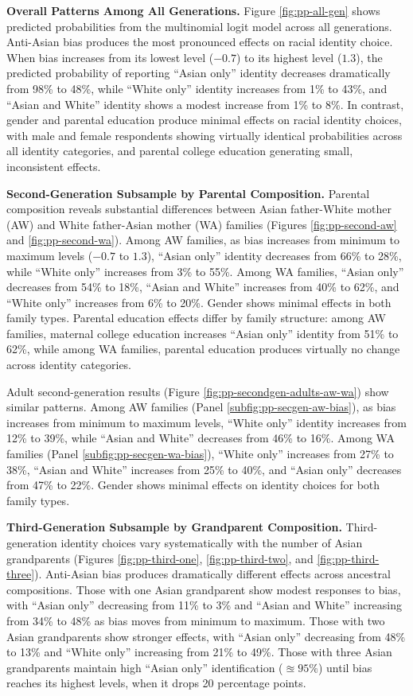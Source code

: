 \textbf{Overall Patterns Among All Generations.} Figure \ref{fig:pp-all-gen} shows predicted probabilities from the multinomial logit model across all generations. Anti-Asian bias produces the most pronounced effects on racial identity choice. When bias increases from its lowest level ($-0.7$) to its highest level ($1.3$), the predicted probability of reporting ``Asian only'' identity decreases dramatically from 98\% to 48\%, while ``White only'' identity increases from 1\% to 43\%, and ``Asian and White'' identity shows a modest increase from 1\% to 8\%. In contrast, gender and parental education produce minimal effects on racial identity choices, with male and female respondents showing virtually identical probabilities across all identity categories, and parental college education generating small, inconsistent effects.

\textbf{Second-Generation Subsample by Parental Composition.} Parental composition reveals substantial differences between Asian father-White mother (AW) and White father-Asian mother (WA) families (Figures \ref{fig:pp-second-aw} and \ref{fig:pp-second-wa}). Among AW families, as bias increases from minimum to maximum levels ($-0.7$ to $1.3$), ``Asian only'' identity decreases from 66\% to 28\%, while ``White only'' increases from 3\% to 55\%. Among WA families, ``Asian only'' decreases from 54\% to 18\%, ``Asian and White'' increases from 40\% to 62\%, and ``White only'' increases from 6\% to 20\%. Gender shows minimal effects in both family types. Parental education effects differ by family structure: among AW families, maternal college education increases ``Asian only'' identity from 51\% to 62\%, while among WA families, parental education produces virtually no change across identity categories.

Adult second-generation results (Figure \ref{fig:pp-secondgen-adults-aw-wa}) show similar patterns. Among AW families (Panel \ref{subfig:pp-secgen-aw-bias}), as bias increases from minimum to maximum levels, ``White only'' identity increases from 12\% to 39\%, while ``Asian and White'' decreases from 46\% to 16\%. Among WA families (Panel \ref{subfig:pp-secgen-wa-bias}), ``White only'' increases from 27\% to 38\%, ``Asian and White'' increases from 25\% to 40\%, and ``Asian only'' decreases from 47\% to 22\%. Gender shows minimal effects on identity choices for both family types.

\textbf{Third-Generation Subsample by Grandparent Composition.} Third-generation identity choices vary systematically with the number of Asian grandparents (Figures \ref{fig:pp-third-one}, \ref{fig:pp-third-two}, and \ref{fig:pp-third-three}). Anti-Asian bias produces dramatically different effects across ancestral compositions. Those with one Asian grandparent show modest responses to bias, with ``Asian only'' decreasing from 11\% to 3\% and ``Asian and White'' increasing from 34\% to 48\% as bias moves from minimum to maximum. Those with two Asian grandparents show stronger effects, with ``Asian only'' decreasing from 48\% to 13\% and ``White only'' increasing from 21\% to 49\%. Those with three Asian grandparents maintain high ``Asian only'' identification ($\approxeq 95\%$) until bias reaches its highest levels, when it drops 20 percentage points. 

